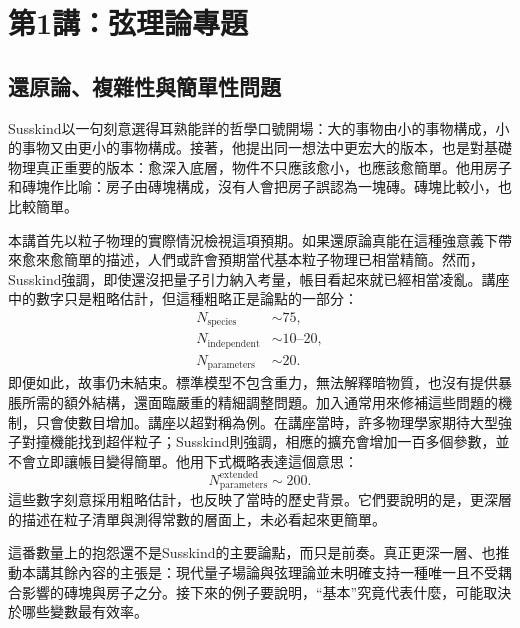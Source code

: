 \chapter{第1講：弦理論專題}


\section{還原論、複雜性與簡單性問題}

Susskind以一句刻意選得耳熟能詳的哲學口號開場：大的事物由小的事物構成，小的事物又由更小的事物構成。接著，他提出同一想法中更宏大的版本，也是對基礎物理真正重要的版本：愈深入底層，物件不只應該愈小，也應該愈簡單。他用房子和磚塊作比喻：房子由磚塊構成，沒有人會把房子誤認為一塊磚。磚塊比較小，也比較簡單。

本講首先以粒子物理的實際情況檢視這項預期。如果還原論真能在這種強意義下帶來愈來愈簡單的描述，人們或許會預期當代基本粒子物理已相當精簡。然而，Susskind強調，即使還沒把量子引力納入考量，帳目看起來就已經相當凌亂。講座中的數字只是粗略估計，但這種粗略正是論點的一部分：
\begin{equation}
\begin{aligned}
N_{\mathrm{species}}&\sim 75,\\
N_{\mathrm{independent}}&\sim 10\text{--}20,\\
N_{\mathrm{parameters}}&\sim 20.
\end{aligned}
\end{equation}
即便如此，故事仍未結束。標準模型不包含重力，無法解釋暗物質，也沒有提供暴脹所需的額外結構，還面臨嚴重的精細調整問題。加入通常用來修補這些問題的機制，只會使數目增加。講座以超對稱為例。在講座當時，許多物理學家期待大型強子對撞機能找到超伴粒子；Susskind則強調，相應的擴充會增加一百多個參數，並不會立即讓帳目變得簡單。他用下式概略表達這個意思：
\begin{equation}
N_{\mathrm{parameters}}^{\mathrm{extended}} \sim 200.
\end{equation}
這些數字刻意採用粗略估計，也反映了當時的歷史背景。它們要說明的是，更深層的描述在粒子清單與測得常數的層面上，未必看起來更簡單。

這番數量上的抱怨還不是Susskind的主要論點，而只是前奏。真正更深一層、也推動本講其餘內容的主張是：現代量子場論與弦理論並未明確支持一種唯一且不受耦合影響的磚塊與房子之分。接下來的例子要說明，``基本''究竟代表什麼，可能取決於哪些變數最有效率。

